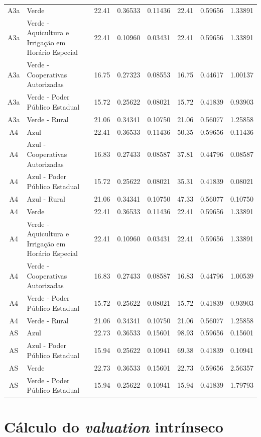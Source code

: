 \documentclass[grad,numbers]{coppe}
\begin{document}
\begin{longtable}[t]{c>{\centering\arraybackslash}p{8em}cccccc}
  A3a & Verde & 22.41 & 0.36533 & 0.11436 & 22.41 & 0.59656 & 1.33891\\
  A3a & Verde - Aquicultura e Irrigação em Horário Especial & 22.41 & 0.10960 & 0.03431 & 22.41 & 0.59656 & 1.33891\\
  \addlinespace
  A3a & Verde - Cooperativas Autorizadas & 16.75 & 0.27323 & 0.08553 & 16.75 & 0.44617 & 1.00137\\
  A3a & Verde - Poder Público Estadual & 15.72 & 0.25622 & 0.08021 & 15.72 & 0.41839 & 0.93903\\
  A3a & Verde - Rural & 21.06 & 0.34341 & 0.10750 & 21.06 & 0.56077 & 1.25858\\
  A4 & Azul & 22.41 & 0.36533 & 0.11436 & 50.35 & 0.59656 & 0.11436\\
  A4 & Azul - Cooperativas Autorizadas & 16.83 & 0.27433 & 0.08587 & 37.81 & 0.44796 & 0.08587\\
  \addlinespace
  A4 & Azul - Poder Público Estadual & 15.72 & 0.25622 & 0.08021 & 35.31 & 0.41839 & 0.08021\\
  A4 & Azul - Rural & 21.06 & 0.34341 & 0.10750 & 47.33 & 0.56077 & 0.10750\\
  A4 & Verde & 22.41 & 0.36533 & 0.11436 & 22.41 & 0.59656 & 1.33891\\
  A4 & Verde - Aquicultura e Irrigação em Horário Especial & 22.41 & 0.10960 & 0.03431 & 22.41 & 0.59656 & 1.33891\\
  A4 & Verde - Cooperativas Autorizadas & 16.83 & 0.27433 & 0.08587 & 16.83 & 0.44796 & 1.00539\\
  \addlinespace
  A4 & Verde - Poder Público Estadual & 15.72 & 0.25622 & 0.08021 & 15.72 & 0.41839 & 0.93903\\
  A4 & Verde - Rural & 21.06 & 0.34341 & 0.10750 & 21.06 & 0.56077 & 1.25858\\
  AS & Azul & 22.73 & 0.36533 & 0.15601 & 98.93 & 0.59656 & 0.15601\\
  AS & Azul - Poder Público Estadual & 15.94 & 0.25622 & 0.10941 & 69.38 & 0.41839 & 0.10941\\
  AS & Verde & 22.73 & 0.36533 & 0.15601 & 22.73 & 0.59656 & 2.56357\\
  \addlinespace
  AS & Verde - Poder Público Estadual & 15.94 & 0.25622 & 0.10941 & 15.94 & 0.41839 & 1.79793\\*
  \end{longtable}
  \endgroup{}

  \hypertarget{cuxe1lculo-do-valuation-intruxednseco}{%
  \section{\texorpdfstring{Cálculo do \emph{valuation} intrínseco}{Cálculo do valuation intrínseco}}\label{cuxe1lculo-do-valuation-intruxednseco}}
\end{document}
